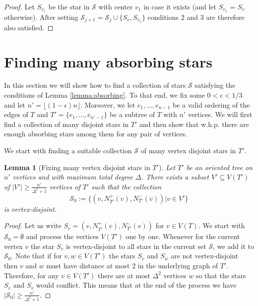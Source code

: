 \documentclass[10pt, a4paper]{article}
\newtheorem{lemma}[theorem]{Lemma}
\theoremstyle{remark}
\begin{document}
\begin{proof}
    Let $S_{v_1}$ be the star in $\mathcal{S}$ with center $v_1$ in case it exists (and let $S_{v_1}$ = $S_v$ otherwise).
    After setting $\mathcal{S}_{j+1} = \mathcal{S}_j \cup \{ S_v, S_{v_1}\}$ conditions 2 and 3 are therefore also satisfied.
\end{proof}

\section{Finding many absorbing stars}\label{section:manystars}
In this section we will show how to find a collection of stars $\mathcal{S}$ satisfying the conditions of Lemma \ref{lemma:absorbing}.
To that end, we fix some $0 < \epsilon < 1/3$ and let $n' = \lfloor (1- \epsilon)n \rfloor$.
Moreover, we let $e_1, \dots, e_{n-1}$ be a valid ordering of the edges of $T$ and $T' = \{ e_1, \dots, e_{n'-1} \}$ be a subtree of $T$ with $n'$ vertices.
We will first find a collection of many disjoint stars in $T'$ and then show that w.h.p. there are enough absorbing stars among them for any pair of vertices.

We start with finding a suitable collection $\mathcal{S}$ of many vertex disjoint stars in $T'$.

\begin{lemma}[Fixing many vertex disjoint stars in $T'$]\label{lemma:findingstars}
    Let $T'$ be an oriented tree on $n'$ vertices and with maximum total degree $\Delta$.
    There exists a subset $V' \subseteq V(T')$ of $|V'| \geq \frac{n'}{\Delta^2+1}$ vertices of $T'$ such that the collection 
    \[\mathcal{S}_0 := \{ (v, N^+_{T'}(v), N^-_{T'}(v)) | v\in V' \}\]
    is vertex-disjoint.
\end{lemma}
\begin{proof}
    Let us write $S_v = (v, N^+_{T'}(v), N^-_{T'}(v))$ for $v \in V(T)$.
    We start with $\mathcal{S}_0 = \emptyset$ and process the vertices $V(T')$ one by one.
    Whenever for the current vertex $v$ the star $S_v$ is vertex-disjoint to all stars in the current set $\mathcal{S}$,
    we add it to $\mathcal{S}_0$.
    Note that if for $v, w \in V(T')$ the stars $S_v$ and $S_w$ are not vertex-disjoint then $v$ and $w$ must have distance at most $2$ in the underlying graph of $T'$.
    Therefore, for any $v \in V(T')$ there are at most $\Delta^2$ vertices $w$ so that the stars $S_v$ and $S_v$ would conflict.
    This means that at the end of the process we have $|\mathcal{S}_0| \geq \frac{n'}{\Delta^2+1}$.
\end{proof}
\end{document}
